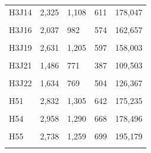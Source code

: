 \documentclass[
  a4paper,
  titlepage]{article}
\begin{document}
\begin{longtable}[t]{lllll}
H3J14 & 2,325 & 1,108 & 611 & 178,047\\
 
\cellcolor{gray!6}{H3J15} & \cellcolor{gray!6}{2,964} & \cellcolor{gray!6}{1,327} & \cellcolor{gray!6}{674} & \cellcolor{gray!6}{189,481}\\
 
H3J16 & 2,037 & 982 & 574 & 162,657\\
 
\cellcolor{gray!6}{H3J18} & \cellcolor{gray!6}{2,489} & \cellcolor{gray!6}{1,113} & \cellcolor{gray!6}{595} & \cellcolor{gray!6}{160,860}\\
 
H3J19 & 2,631 & 1,205 & 597 & 158,003\\
 
\cellcolor{gray!6}{H3J20} & \cellcolor{gray!6}{2,080} & \cellcolor{gray!6}{1,034} & \cellcolor{gray!6}{567} & \cellcolor{gray!6}{164,461}\\
 
H3J21 & 1,486 & 771 & 387 & 109,503\\
 
\cellcolor{gray!6}{H18} & \cellcolor{gray!6}{2,499} & \cellcolor{gray!6}{1,075} & \cellcolor{gray!6}{634} & \cellcolor{gray!6}{186,033}\\
 
H3J22 & 1,634 & 769 & 504 & 126,367\\
 
\cellcolor{gray!6}{H50} & \cellcolor{gray!6}{2,793} & \cellcolor{gray!6}{1,301} & \cellcolor{gray!6}{660} & \cellcolor{gray!6}{194,166}\\
 
H51 & 2,832 & 1,305 & 642 & 175,235\\
 
\cellcolor{gray!6}{H52} & \cellcolor{gray!6}{3,042} & \cellcolor{gray!6}{1,365} & \cellcolor{gray!6}{714} & \cellcolor{gray!6}{199,699}\\
 
H54 & 2,958 & 1,290 & 668 & 178,496\\
 
\cellcolor{gray!6}{H4} & \cellcolor{gray!6}{1,655} & \cellcolor{gray!6}{827} & \cellcolor{gray!6}{526} & \cellcolor{gray!6}{149,155}\\
 
H55 & 2,738 & 1,259 & 699 & 195,179\\
 
\cellcolor{gray!6}{H56} & \cellcolor{gray!6}{2,538} & \cellcolor{gray!6}{1,178} & \cellcolor{gray!6}{613} & \cellcolor{gray!6}{164,575}\\
 

\end{longtable}
\end{document}
